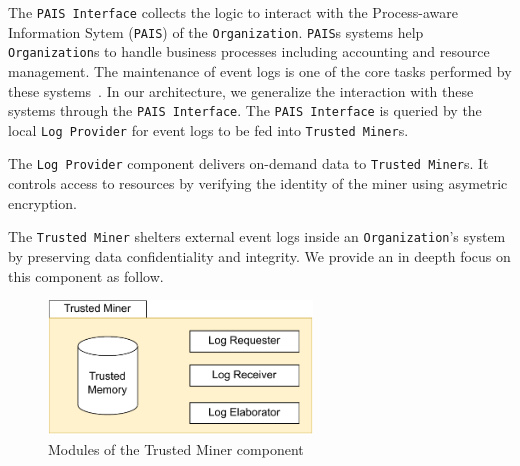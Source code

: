 The \texttt{PAIS Interface} collects the logic to interact with the Process-aware Information Sytem (\texttt{PAIS}) of the \texttt{Organization}. \texttt{PAIS}s systems help \texttt{Organization}s to handle business processes including accounting and resource management. The maintenance of event logs is one of the core tasks performed by these systems~\cite{Dumas.etal/2018:FundamentalsofBPM}. In our architecture, we generalize the interaction with these systems through the \texttt{PAIS Interface}. The \texttt{PAIS Interface} is queried by the local \texttt{Log Provider} for event logs to be fed into \texttt{Trusted Miner}s. 


The \texttt{Log Provider} component delivers on-demand data to \texttt{Trusted Miner}s. %
It controls access to resources by verifying the identity of the miner %
using asymetric encryption. %

The \texttt{Trusted Miner} shelters external event logs inside an \texttt{Organization}'s system by preserving data confidentiality and integrity. We provide an in deepth focus on this component as follow.

\begin{figure}[t]
\centering
\includegraphics[width=7cm]{content/figures/trusted_miner.pdf}
\caption{Modules of the Trusted Miner component}
\label{fig:trusted_miner}
\end{figure}






